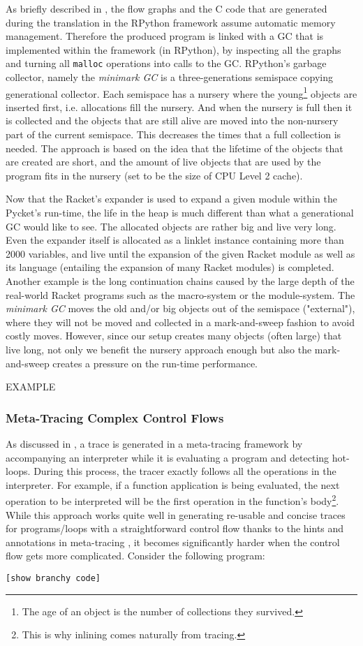 As briefly described in , the flow graphs and
the C code that are generated during the translation in the RPython
framework assume automatic memory management. Therefore the produced
program is linked with a GC that is implemented within the framework
(in RPython), by inspecting all the graphs and turning all
\texttt{malloc} operations into calls to the GC. RPython's garbage
collector, namely the \emph{minimark GC} is a three-generations
semispace copying generational collector. Each semispace has a nursery
where the young\footnote{The age of an object is the number of
  collections they survived.}  objects are inserted first,
i.e. allocations fill the nursery. And when the nursery is full then
it is collected and the objects that are still alive are moved into
the non-nursery part of the current semispace. This decreases the
times that a full collection is needed. The approach is based on the
idea that the lifetime of the objects that are created are short, and
the amount of live objects that are used by the program fits in the
nursery (set to be the size of CPU Level 2 cache). \cite{pypy06,
  bolz:14, gc:16, gc:12}

Now that the Racket's expander is used to expand a given module within
the Pycket's run-time, the life in the heap is much different than
what a generational GC would like to see. The allocated objects are
rather big and live very long. Even the expander itself is allocated
as a linklet instance containing more than 2000 variables, and live
until the expansion of the given Racket module as well as its language
(entailing the expansion of many Racket modules) is completed. Another
example is the long continuation chains caused by the large depth of
the real-world Racket programs such as the macro-system or the
module-system. The \emph{minimark GC} moves the old and/or big objects
out of the semispace ("external"), where they will not be moved and
collected in a mark-and-sweep fashion to avoid costly moves. However,
since our setup creates many objects (often large) that live long, not
only we benefit the nursery approach enough but also the
mark-and-sweep creates a pressure on the run-time performance.

EXAMPLE

\subsubsection{Meta-Tracing Complex Control Flows}

As discussed in , a trace is generated in a
meta-tracing framework by accompanying an interpreter while it is
evaluating a program and detecting hot-loops. During this process, the
tracer exactly follows all the operations in the interpreter. For
example, if a function application is being evaluated, the next
operation to be interpreted will be the first operation in the
function's body\footnote{This is why inlining comes naturally from
  tracing.}. While this approach works quite well in generating
re-usable and concise traces for programs/loops with a straightforward
control flow thanks to the hints and annotations in meta-tracing
\cite{bolz09}, it becomes significantly harder when the control flow
gets more complicated. Consider the following program:

\begin{lstlisting}[mathescape]
[show branchy code]
\end{lstlisting}
